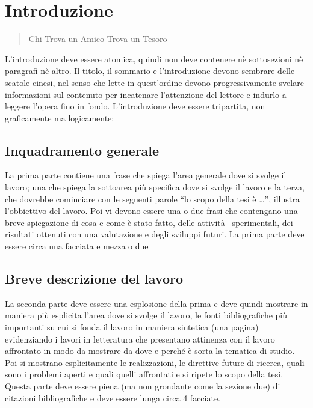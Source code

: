 \chapter{Introduzione}
\label{Introduzione}
\thispagestyle{empty}

\begin{quotation}
{\footnotesize
{}
\begin{flushright}
Chi Trova un Amico Trova un Tesoro
\end{flushright}
}
\end{quotation}
\vspace{0.5cm}

\noindent L'introduzione deve essere atomica, quindi non deve contenere n\`e sottosezioni n\`e paragrafi n\`e altro. Il titolo, il sommario e l'introduzione devono sembrare delle scatole cinesi, nel senso che lette in quest'ordine devono progressivamente svelare informazioni sul contenuto per incatenare l'attenzione del lettore e indurlo a leggere l'opera fino in fondo. L'introduzione deve essere tripartita, non graficamente ma logicamente:

\section{Inquadramento generale}
La prima parte contiene una frase che spiega l'area generale dove si svolge il lavoro; una che spiega la sottoarea pi\`u specifica dove si svolge il lavoro e la terza, che dovrebbe cominciare con le seguenti parole ``lo scopo della tesi \`e \dots'', illustra l'obbiettivo del lavoro. Poi vi devono essere una o due frasi che contengano una breve spiegazione di cosa e come \`e stato fatto, delle attivit\`a  sperimentali, dei risultati ottenuti con una valutazione e degli sviluppi futuri. La prima parte deve essere circa una facciata e mezza o due

\section{Breve descrizione del lavoro}
La seconda parte deve essere una esplosione della prima e deve quindi mostrare in maniera pi\`u esplicita l'area dove si svolge il lavoro, le fonti bibliografiche pi\`u importanti su cui si fonda il lavoro in maniera sintetica (una pagina) evidenziando i lavori in letteratura che presentano attinenza con il lavoro affrontato in modo da mostrare da dove e perch\'e \`e sorta la tematica di studio. Poi si mostrano esplicitamente le realizzazioni, le direttive future di ricerca, quali sono i problemi aperti e quali quelli affrontati e si ripete lo scopo della tesi. Questa parte deve essere piena (ma non grondante come la sezione due) di citazioni bibliografiche e deve essere lunga circa 4 facciate.

